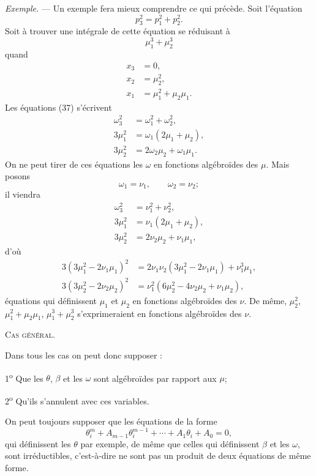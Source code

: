 \documentclass[11pt]{article}
\begin{document}
\emph{Exemple.} --- Un exemple fera mieux comprendre ce qui précède. Soit l’équation
\[
p_3^2=p_1^2+p_2^2.
\]
Soit à trouver une intégrale de cette équation se réduisant à
\[
\mu_1^3+\mu_2^3
\]
quand
\[
\begin{aligned}
x_3&=0,\\
x_2&=\mu_2^2,\\
x_1&=\mu_1^2+\mu_2\mu_1.
\end{aligned}
\]
Les équations (37) s’écrivent
\[
\begin{aligned}
\omega_3^2&=\omega_1^2+\omega_2^2,\\
3\mu_1^2&=\omega_1(2\mu_1+\mu_2),\\
3\mu_2^2&=2\omega_2\mu_2+\omega_1\mu_1.
\end{aligned}
\]
On ne peut tirer de ces équations les $\omega$ en fonctions algébroïdes des $\mu$.
Mais posons
\[
\omega_1=\nu_1,\qquad \omega_2=\nu_2;
\]
il viendra
\[
\begin{aligned}
\omega_3^2&=\nu_1^2+\nu_2^2,\\
3\mu_1^2&=\nu_1(2\mu_1+\mu_2),\\
3\mu_2^2&=2\nu_2\mu_2+\nu_1\mu_1,
\end{aligned}
\]
d’où
\[
\begin{aligned}
3(3\mu_1^2-2\nu_1\mu_1)^2&=2\nu_1\nu_2(3\mu_1^2-2\nu_1\mu_1)+\nu_1^3\mu_1,\\
3(3\mu_2^2-2\nu_2\mu_2)^2&=\nu_1^2(6\mu_2^2-4\nu_2\mu_2+\nu_1\mu_2),
\end{aligned}
\]
équations qui définissent $\mu_1$ et $\mu_2$ en fonctions algébroïdes des $\nu$. De même, $\mu_2^2$, $\mu_1^2+\mu_2\mu_1$, $\mu_1^3+\mu_2^3$ s’exprimeraient en fonctions algébroïdes des $\nu$.

\begin{center}
{\scshape Cas général.}
\end{center}

Dans tous les cas on peut donc supposer :

1\textsuperscript{o} Que les $\theta$, $\beta$ et les $\omega$ sont algébroïdes par rapport aux $\mu$;

2\textsuperscript{o} Qu’ils s’annulent avec ces variables.

On peut toujours supposer que les équations de la forme
\[
\theta_i^m+A_{m-1}\theta_i^{m-1}+\cdots+A_1\theta_i+A_0=0,
\]
qui définissent les $\theta$ par exemple, de même que celles qui définissent $\beta$ et les $\omega$, sont irréductibles, c’est-à-dire ne sont pas un produit de deux équations de même forme.
\end{document}
